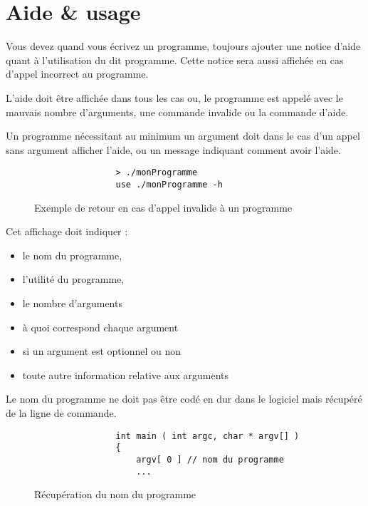 	\section{Aide \& usage}
		Vous devez quand vous écrivez un programme, toujours ajouter une notice d'aide quant à l'utilisation du dit programme. Cette notice sera aussi affichée en cas d'appel incorrect au programme.

		L'aide doit être affichée dans tous les cas ou, le programme est appelé avec le mauvais nombre d'arguments, une commande invalide ou la commande d'aide.

		Un programme nécessitant au minimum un argument doit dans le cas d'un appel sans argument afficher l'aide, ou un message indiquant comment avoir l'aide.

		\begin{figure}[H]
			\begin{changemargin}{-2.5cm}{-2.5cm}
			\begin{tcolorbox}
			\begin{verbatim}
				> ./monProgramme
				use ./monProgramme -h
			\end{verbatim}
			\end{tcolorbox}
			\end{changemargin}
			\caption{Exemple de retour en cas d'appel invalide à un programme}
		\end{figure}

		Cet affichage doit indiquer : 
		\begin{itemize}
			\item le nom du programme,
			\item l'utilité du programme,
			\item le nombre d'arguments
			\item à quoi correspond chaque argument
			\item si un argument est optionnel ou non
			\item toute autre information relative aux arguments
		\end{itemize}

		Le nom du programme ne doit pas être codé en dur dans le logiciel mais récupéré de la ligne de commande.

		\begin{figure}[H]
			\begin{changemargin}{-2.5cm}{-2.5cm}
			\begin{tcolorbox}
			\begin{verbatim}
				int main ( int argc, char * argv[] )
				{
				    argv[ 0 ] // nom du programme
				    ...
			\end{verbatim}
			\end{tcolorbox}
			\end{changemargin}
			\caption{Récupération du nom du programme}
		\end{figure}

